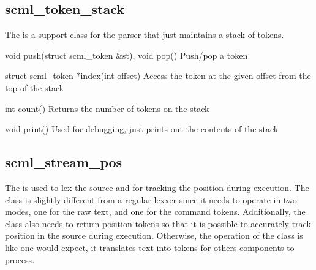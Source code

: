 \subsection{scml\_token\_stack}

The  is a support class for the parser that just
maintains a stack of tokens.

\begin{cprototypelist}
  \item[void push(struct scml_token &st), void pop()] Push/pop a
  token

  \item[struct scml_token *index(int offset)] Access the token at
  the given offset from the top of the stack

  \item[int count()] Returns the number of tokens on the stack

  \item[void print()] Used for debugging, just prints out the
  contents of the stack
\end{cprototypelist}

\subsection{scml\_stream\_pos}

The  is used to lex the \SCML{} source and for tracking the
position during execution.  The class is slightly different from a regular
lexxer since it needs to operate in two modes, one for the raw text, and one
for the command tokens.  Additionally, the class also needs to return position
tokens so that it is possible to accurately track position in the source during
execution.  Otherwise, the operation of the class is like one would expect, it
translates text into tokens for others components to process.

